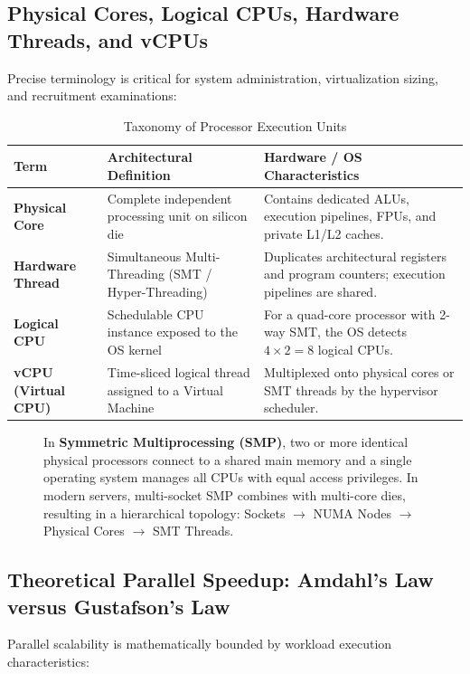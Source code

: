 \subsection{Physical Cores, Logical CPUs, Hardware Threads, and vCPUs}
Precise terminology is critical for system administration, virtualization sizing, and recruitment examinations:
\begin{table}[htbp]
\centering
\small
\caption{Taxonomy of Processor Execution Units}
\label{tab:cpu_execution_units}
\begin{tabularx}{\textwidth}{l p{3.5cm} X}
\toprule
\textbf{Term} & \textbf{Architectural Definition} & \textbf{Hardware / OS Characteristics} \\
\midrule
\textbf{Physical Core} & Complete independent processing unit on silicon die & Contains dedicated ALUs, execution pipelines, FPUs, and private L1/L2 caches. \\
\textbf{Hardware Thread} & Simultaneous Multi-Threading (SMT / Hyper-Threading) & Duplicates architectural registers and program counters; execution pipelines are shared. \\
\textbf{Logical CPU} & Schedulable CPU instance exposed to the OS kernel & For a quad-core processor with 2-way SMT, the OS detects $4 \times 2 = 8$ logical CPUs. \\
\textbf{vCPU (Virtual CPU)} & Time-sliced logical thread assigned to a Virtual Machine & Multiplexed onto physical cores or SMT threads by the hypervisor scheduler. \\
\bottomrule
\end{tabularx}
\end{table}

\begin{figure}[htbp]
\centering
\begin{tcolorbox}[colback=codebg, colframe=primary, title=\textbf{SMP and Multi-Core Performance Distinction}]
In \textbf{Symmetric Multiprocessing (SMP)}, two or more identical physical processors connect to a shared main memory and a single operating system manages all CPUs with equal access privileges. In modern servers, multi-socket SMP combines with multi-core dies, resulting in a hierarchical topology: Sockets $\to$ NUMA Nodes $\to$ Physical Cores $\to$ SMT Threads.
\end{tcolorbox}
\end{figure}

\subsection{Theoretical Parallel Speedup: Amdahl's Law versus Gustafson's Law}
Parallel scalability is mathematically bounded by workload execution characteristics:

